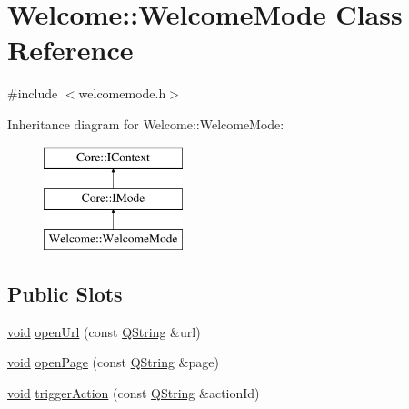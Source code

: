 \hypertarget{class_welcome_1_1_welcome_mode}{\section{\-Welcome\-:\-:\-Welcome\-Mode \-Class \-Reference}
\label{class_welcome_1_1_welcome_mode}
}


{\ttfamily \#include $<$welcomemode.\-h$>$}

\-Inheritance diagram for \-Welcome\-:\-:\-Welcome\-Mode\-:\begin{figure}[H]
\begin{center}
\leavevmode
\includegraphics[height=3.000000cm]{class_welcome_1_1_welcome_mode}
\end{center}
\end{figure}
\subsection*{\-Public \-Slots}
\begin{DoxyCompactItemize}
\item 
\hyperlink{group___u_a_v_objects_plugin_ga444cf2ff3f0ecbe028adce838d373f5c}{void} \hyperlink{group___welcome_plugin_ga7c451e1e31c9e70b1ba15be45ac25177}{open\-Url} (const \hyperlink{group___u_a_v_objects_plugin_gab9d252f49c333c94a72f97ce3105a32d}{\-Q\-String} \&url)
\item 
\hyperlink{group___u_a_v_objects_plugin_ga444cf2ff3f0ecbe028adce838d373f5c}{void} \hyperlink{group___welcome_plugin_gac98c3a91d41a1a3c391d5a4d1fd8ab92}{open\-Page} (const \hyperlink{group___u_a_v_objects_plugin_gab9d252f49c333c94a72f97ce3105a32d}{\-Q\-String} \&page)
\item 
\hyperlink{group___u_a_v_objects_plugin_ga444cf2ff3f0ecbe028adce838d373f5c}{void} \hyperlink{group___welcome_plugin_gabf623de0434e61036632f9a4dd3f06d3}{trigger\-Action} (const \hyperlink{group___u_a_v_objects_plugin_gab9d252f49c333c94a72f97ce3105a32d}{\-Q\-String} \&action\-Id)
\end{DoxyCompactItemize}
